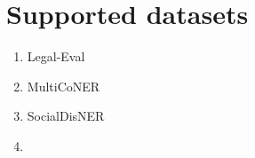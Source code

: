 \documentclass{article}
\begin{document}
\section{Supported datasets}
\begin{enumerate}
  \item Legal-Eval
  \item MultiCoNER
  \item SocialDisNER
  \item 
\end{enumerate}
\end{document}
